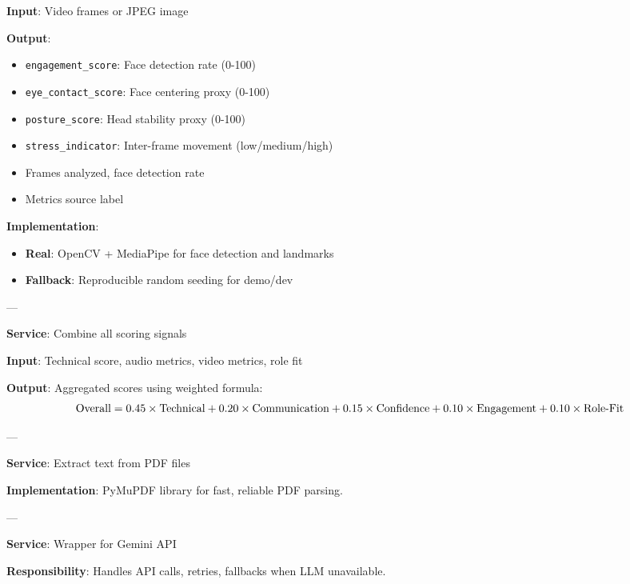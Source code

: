 \documentclass[11pt]{article}
\begin{document}
\begin{description}[leftmargin=3cm, style=nextline]
  \textbf{Input}: Video frames or JPEG image

  \textbf{Output}:
  \begin{itemize}
    \item \texttt{engagement\_score}: Face detection rate (0-100)
    \item \texttt{eye\_contact\_score}: Face centering proxy (0-100)
    \item \texttt{posture\_score}: Head stability proxy (0-100)
    \item \texttt{stress\_indicator}: Inter-frame movement (low/medium/high)
    \item Frames analyzed, face detection rate
    \item Metrics source label
  \end{itemize}

  \textbf{Implementation}:
  \begin{itemize}
    \item \textbf{Real}: OpenCV + MediaPipe for face detection and landmarks
    \item \textbf{Fallback}: Reproducible random seeding for demo/dev
  \end{itemize}

  ---

  \item[\textbf{multimodal\_aggregator}]
  \textbf{Service}: Combine all scoring signals

  \textbf{Input}: Technical score, audio metrics, video metrics, role fit

  \textbf{Output}: Aggregated scores using weighted formula:
  \begin{equation}
  \text{Overall} = 0.45 \times \text{Technical} + 0.20 \times \text{Communication}
  + 0.15 \times \text{Confidence} + 0.10 \times \text{Engagement} + 0.10 \times \text{Role\text{-}Fit}
  \end{equation}

  ---

  \item[\textbf{pdf\_parser}]
  \textbf{Service}: Extract text from PDF files

  \textbf{Implementation}: PyMuPDF library for fast, reliable PDF parsing.

  ---

  \item[\textbf{llm\_client}]
  \textbf{Service}: Wrapper for Gemini API

  \textbf{Responsibility}: Handles API calls, retries, fallbacks when LLM unavailable.


\end{description}
\end{document}
